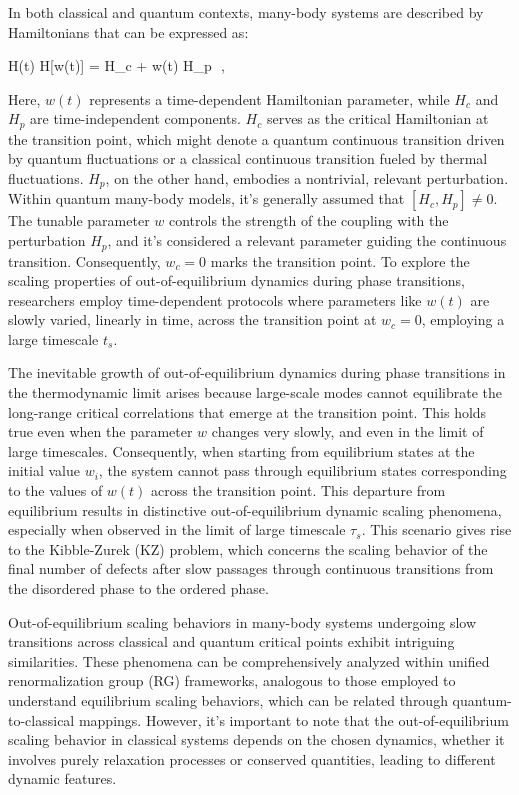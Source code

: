 In both classical and quantum contexts, many-body systems are described by Hamiltonians that can be expressed as:

    H(t) \equiv H[w(t)] = H_c + w(t) H_p \,\,,
\ea

Here, $w(t)$ represents a time-dependent Hamiltonian parameter, while $H_c$ and $H_p$ are time-independent components. $H_c$ serves as the critical Hamiltonian at the transition point, which might denote a quantum continuous transition driven by quantum fluctuations or a classical continuous transition fueled by thermal fluctuations. $H_p$, on the other hand, embodies a nontrivial, relevant perturbation. Within quantum many-body models, it's generally assumed that $[H_c, H_p] \neq 0$. The tunable parameter $w$ controls the strength of the coupling with the perturbation $H_p$, and it's considered a relevant parameter guiding the continuous transition. Consequently, $w_c = 0$ marks the transition point. To explore the scaling properties of out-of-equilibrium dynamics during phase transitions, researchers employ time-dependent protocols where parameters like $w(t)$ are slowly varied, linearly in time, across the transition point at $w_c = 0$, employing a large timescale $t_s$.

The inevitable growth of out-of-equilibrium dynamics during phase transitions in the thermodynamic limit arises because large-scale modes cannot equilibrate the long-range critical correlations that emerge at the transition point. This holds true even when the parameter $w$ changes very slowly, and even in the limit of large timescales. Consequently, when starting from equilibrium states at the initial value $w_i$, the system cannot pass through equilibrium states corresponding to the values of $w(t)$ across the transition point. This departure from equilibrium results in distinctive out-of-equilibrium dynamic scaling phenomena, especially when observed in the limit of large timescale $\tau_s$. This scenario gives rise to the Kibble-Zurek (KZ) problem, which concerns the scaling behavior of the final number of defects after slow passages through continuous transitions from the disordered phase to the ordered phase.

Out-of-equilibrium scaling behaviors in many-body systems undergoing slow transitions across classical and quantum critical points exhibit intriguing similarities. These phenomena can be comprehensively analyzed within unified renormalization group (RG) frameworks, analogous to those employed to understand equilibrium scaling behaviors, which can be related through quantum-to-classical mappings. However, it's important to note that the out-of-equilibrium scaling behavior in classical systems depends on the chosen dynamics, whether it involves purely relaxation processes or conserved quantities, leading to different dynamic features.

